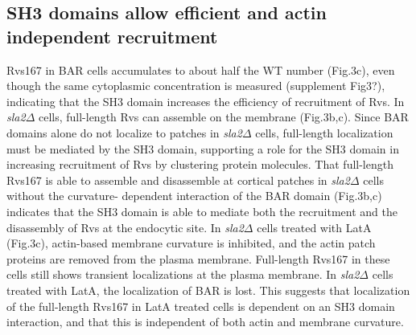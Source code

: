 \documentclass[9pt,lineno]{elife}
\begin{document}

\subsection{SH3 domains allow efficient and actin independent recruitment}

Rvs167 in BAR cells accumulates to about half the WT number (Fig.3c), even though the same cytoplasmic concentration is measured (supplement Fig3?), indicating that the SH3 domain increases the efficiency of recruitment of Rvs.  In \textit{sla2$\Delta$} cells, full-length Rvs can assemble on the membrane (Fig.3b,c). Since BAR domains alone do not localize to patches in \textit{sla2$\Delta$} cells, full-length localization must be mediated by the SH3 domain, supporting a role for the SH3 domain in increasing recruitment of Rvs by clustering protein molecules. That full-length Rvs167 is able to assemble and disassemble at cortical patches in \textit{sla2$\Delta$} cells without the curvature- dependent interaction of the BAR domain (Fig.3b,c) indicates that the SH3 domain is able to mediate both the recruitment and the disassembly of Rvs at the endocytic site. In \textit{sla2$\Delta$} cells treated with LatA (Fig.3c), actin-based membrane curvature is inhibited, and the actin patch proteins are removed from the plasma membrane. Full-length Rvs167 in these cells still shows transient localizations at the plasma membrane. In \textit{sla2$\Delta$} cells treated with LatA, the localization of BAR is lost. This suggests that localization of the full-length Rvs167 in LatA treated cells is dependent on an SH3 domain interaction, and that this is independent of both actin and membrane curvature.
\end{document}
